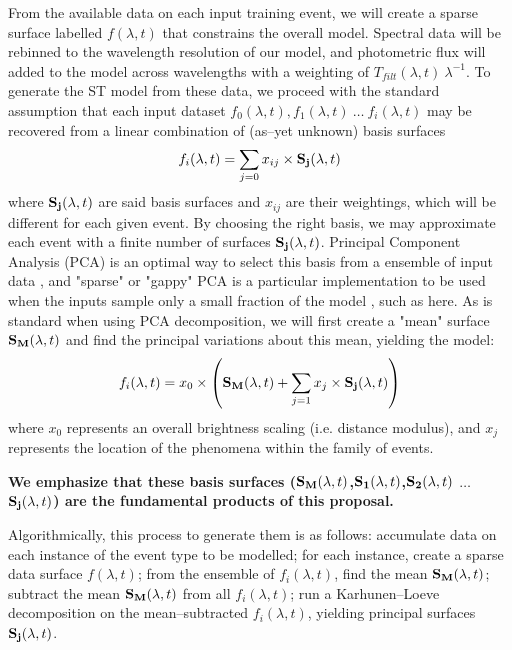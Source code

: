 From the available data on each input training event, we will create a sparse
surface labelled $f(\lambda, t)$ that constrains the overall model.  Spectral
data will be rebinned to the wavelength resolution of our model, and photometric
flux will added to the model across wavelengths with a weighting of
$T_{filt}(\lambda, t)~\lambda^{-1}$.  To generate the ST model from these data,
we proceed with the standard assumption that each input dataset $f_0(\lambda,
t), f_1(\lambda, t)~\ldots~f_i(\lambda, t)$ may be recovered from a linear
combination of (as--yet unknown) basis surfaces $$f_i(\lambda, t) = \sum_{j=0}
x_{ij} \times {\bf S_j}(\lambda, t)$$ where ${\bf S_j}(\lambda, t)$ are said
basis surfaces and $x_{ij}$ are their weightings, which will be different for
each given event.  By choosing the right basis, we may approximate each event
with a finite number of surfaces ${\bf S_j}(\lambda, t)$. Principal Component
Analysis (PCA) is an optimal way to select this basis from a ensemble of input
data \cite[e.g.][for astrophysical application to galaxy
spectra]{1995AJ....110.1071C}, and "sparse" or "gappy" PCA is a particular
implementation to be used when the inputs sample only a small fraction of the
model \citep{zouht04}, such as here.  As is standard when using PCA
decomposition, we will first create a "mean" surface ${\bf S_M}(\lambda, t)$ and
find the principal variations about this mean, yielding the model:
$$f_i(\lambda, t) = x_0 \times \left( {\bf S_M}(\lambda, t) + \sum_{j=1} x_j
\times {\bf S_j}(\lambda, t) \right)$$ where $x_0$ represents an overall
brightness scaling (i.e. distance modulus), and $x_j$ represents the location of
the phenomena within the family of events.

\begin{center} {\bf We emphasize that these basis surfaces (${\bf S_M}(\lambda,
t)$,${\bf S_1}(\lambda, t)$,${\bf S_2}(\lambda, t)$ $\ldots$ ${\bf S_j}(\lambda,
t)$) are the fundamental products of this proposal.} \end{center}

Algorithmically, this process to generate them is as follows: accumulate data on
each instance of the event type to be modelled; for each instance, create a
sparse data surface $f(\lambda, t)$; from the ensemble of $f_i(\lambda, t)$,
find the mean ${\bf S_M}(\lambda, t)$; subtract the mean ${\bf S_M}(\lambda, t)$
from all $f_i(\lambda, t)$; run a Karhunen--Loeve decomposition
\citep{Karhunen:47,Loeve:48} on the mean--subtracted $f_i(\lambda, t)$, yielding
principal surfaces ${\bf S_j}(\lambda, t)$.

